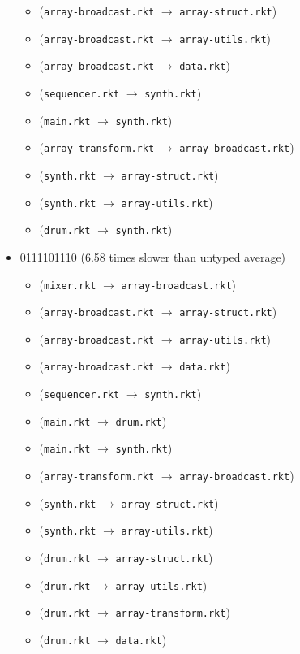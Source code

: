 \documentclass{article}
\newcommand{\mono}[1]{\texttt{#1}}
\begin{document}
\begin{itemize}
\begin{itemize}
  \item (\mono{array-broadcast.rkt} $\rightarrow$ \mono{array-struct.rkt})
  \item (\mono{array-broadcast.rkt} $\rightarrow$ \mono{array-utils.rkt})
  \item (\mono{array-broadcast.rkt} $\rightarrow$ \mono{data.rkt})
  \item (\mono{sequencer.rkt} $\rightarrow$ \mono{synth.rkt})
  \item (\mono{main.rkt} $\rightarrow$ \mono{synth.rkt})
  \item (\mono{array-transform.rkt} $\rightarrow$ \mono{array-broadcast.rkt})
  \item (\mono{synth.rkt} $\rightarrow$ \mono{array-struct.rkt})
  \item (\mono{synth.rkt} $\rightarrow$ \mono{array-utils.rkt})
  \item (\mono{drum.rkt} $\rightarrow$ \mono{synth.rkt})
  \end{itemize}
\item 0111101110 (6.58 times slower than untyped average)
  \begin{itemize}
  \item (\mono{mixer.rkt} $\rightarrow$ \mono{array-broadcast.rkt})
  \item (\mono{array-broadcast.rkt} $\rightarrow$ \mono{array-struct.rkt})
  \item (\mono{array-broadcast.rkt} $\rightarrow$ \mono{array-utils.rkt})
  \item (\mono{array-broadcast.rkt} $\rightarrow$ \mono{data.rkt})
  \item (\mono{sequencer.rkt} $\rightarrow$ \mono{synth.rkt})
  \item (\mono{main.rkt} $\rightarrow$ \mono{drum.rkt})
  \item (\mono{main.rkt} $\rightarrow$ \mono{synth.rkt})
  \item (\mono{array-transform.rkt} $\rightarrow$ \mono{array-broadcast.rkt})
  \item (\mono{synth.rkt} $\rightarrow$ \mono{array-struct.rkt})
  \item (\mono{synth.rkt} $\rightarrow$ \mono{array-utils.rkt})
  \item (\mono{drum.rkt} $\rightarrow$ \mono{array-struct.rkt})
  \item (\mono{drum.rkt} $\rightarrow$ \mono{array-utils.rkt})
  \item (\mono{drum.rkt} $\rightarrow$ \mono{array-transform.rkt})
  \item (\mono{drum.rkt} $\rightarrow$ \mono{data.rkt})

\end{itemize}
\end{itemize}
\end{document}
